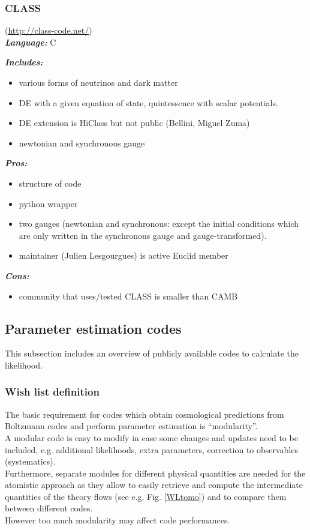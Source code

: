 \subsubsection{CLASS}(\url{http://class-code.net/})\\

{\it \bf  Language:} C

{\it \bf Includes:}
\begin{itemize}
 \item various forms of neutrinos and dark matter
 \item DE with a given equation of state, quintessence with scalar potentials.
 \item DE extension is HiClass but not public (Bellini, Miguel Zuma)
 \item newtonian and synchronous gauge
\end{itemize}

{\it \bf Pros: }
\begin{itemize}
 \item structure of code
 \item python wrapper
 \item two gauges (newtonian and synchronous: except the initial conditions which are only written in the synchronous gauge and gauge-transformed). 
 \item maintainer (Julien Lesgourgues) is active Euclid member
\end{itemize}

{\it \bf Cons: }
\begin{itemize}
 \item community that uses/tested CLASS is smaller than CAMB
\end{itemize}


\newpage
\subsection{Parameter estimation codes}
This subsection includes an overview of publicly available codes to calculate the likelihood.

\subsubsection{Wish list definition}

The basic requirement for codes which obtain cosmological predictions from Boltzmann codes and perform parameter estimation is ``modularity''.\\
A modular code is easy to modify in case some changes and updates need to be included, e.g. additional likelihoods, extra parameters, correction to observables (systematics).\\
Furthermore, separate modules for different physical quantities are needed for the atomistic approach as they allow to easily retrieve and compute the intermediate quantities of the theory
flows (see e.g. Fig. \ref{WLtomo}) and to compare them between different codes.\\
However too much modularity may affect code performances.\\

